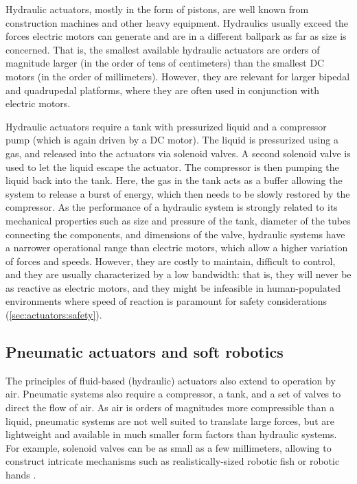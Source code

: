 Hydraulic actuators, mostly in the form of pistons, are well known from construction machines and other heavy equipment. Hydraulics usually exceed the forces electric motors can generate and are in a different ballpark as far as size is concerned. That is, the smallest available hydraulic actuators are orders of magnitude larger (in the order of tens of centimeters) than the smallest DC motors (in the order of millimeters). However, they are relevant for larger bipedal and quadrupedal platforms, where they are often used in conjunction with electric motors.

Hydraulic actuators require a tank with pressurized liquid and a compressor pump (which is again driven by a DC motor). The liquid is pressurized using a gas, and released into the actuators via solenoid valves. A second solenoid valve is used to let the liquid escape the actuator. The compressor is then pumping the liquid back into the tank. Here, the gas in the tank acts as a buffer allowing the system to release a burst of energy, which then needs to be slowly restored by the compressor. As the performance of a hydraulic system is strongly related to its mechanical properties such as size and pressure of the tank, diameter of the tubes connecting the components, and dimensions of the valve, hydraulic systems have a narrower operational range than electric motors, which allow a higher variation of forces and speeds.
However, they are costly to maintain, difficult to control, and they are usually characterized by a low bandwidth: that is, they will never be as reactive as electric motors, and they might be infeasible in human-populated environments where speed of reaction is paramount for safety considerations (\cref{sec:actuators:safety}).

\subsection{Pneumatic actuators and soft robotics}

The principles of fluid-based (hydraulic) actuators also extend to operation by air. Pneumatic systems also require a compressor, a tank, and a set of valves to direct the flow of air. As air is orders of magnitudes more compressible than a liquid, pneumatic systems are not well suited to translate large forces, but are lightweight and available in much smaller form factors than hydraulic systems. For example, solenoid valves can be as small as a few millimeters, allowing to construct intricate mechanisms such as realistically-sized robotic fish \cite{katzschmann2018exploration} or robotic hands \cite{deimel2016novel}.

